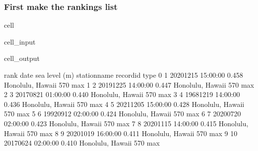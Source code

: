 \documentclass[letterpaper,10pt,english]{jupyterBook}
\begin{document}
\subsubsection{First make the rankings list}
\label{\detokenize{notebooks/regional_and_local/SL_Extremes_annual:first-make-the-rankings-list}}
\begin{sphinxuseclass}{cell}\begin{sphinxVerbatimInput}

\begin{sphinxuseclass}{cell_input}
\begin{sphinxVerbatim}[commandchars=\\\{\}]
  
  
\PYG{p}{[}\PYG{p}{]}  \PYG{p}{[}\PYG{p}{]}
  

  \PYG{p}{[}\PYG{p}{[}\PYG{p}{]}\PYG{p}{]}
\end{sphinxVerbatim}

\end{sphinxuseclass}\end{sphinxVerbatimInput}
\begin{sphinxVerbatimOutput}

\begin{sphinxuseclass}{cell_output}
\begin{sphinxVerbatim}[commandchars=\\\{\}]
   rank                date  sea level (m)      station\PYGZus{}name record\PYGZus{}id type
0     1 2020\PYGZhy{}12\PYGZhy{}15 15:00:00          0.458  Honolulu, Hawaii       570  max
1     2 2019\PYGZhy{}12\PYGZhy{}25 14:00:00          0.447  Honolulu, Hawaii       570  max
2     3 2017\PYGZhy{}08\PYGZhy{}21 01:00:00          0.440  Honolulu, Hawaii       570  max
3     4 1968\PYGZhy{}12\PYGZhy{}19 14:00:00          0.436  Honolulu, Hawaii       570  max
4     5 2021\PYGZhy{}12\PYGZhy{}05 15:00:00          0.428  Honolulu, Hawaii       570  max
5     6 1992\PYGZhy{}09\PYGZhy{}12 02:00:00          0.424  Honolulu, Hawaii       570  max
6     7 2020\PYGZhy{}07\PYGZhy{}20 02:00:00          0.423  Honolulu, Hawaii       570  max
7     8 2020\PYGZhy{}11\PYGZhy{}15 14:00:00          0.415  Honolulu, Hawaii       570  max
8     9 2020\PYGZhy{}10\PYGZhy{}19 16:00:00          0.411  Honolulu, Hawaii       570  max
9    10 2017\PYGZhy{}06\PYGZhy{}24 02:00:00          0.410  Honolulu, Hawaii       570  max
\end{sphinxVerbatim}


\end{sphinxuseclass}
\end{sphinxVerbatimOutput}
\end{sphinxuseclass}
\end{document}
